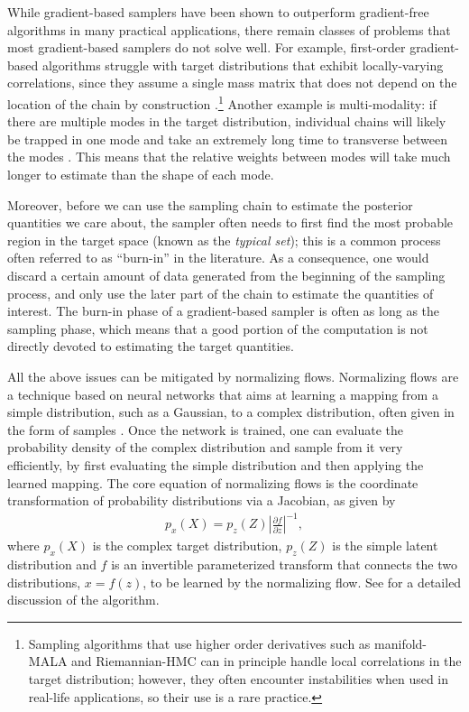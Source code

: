 \documentclass[twocolumn]{aastex631}
\begin{document}
While gradient-based samplers have been shown to outperform gradient-free
algorithms in many practical applications, there remain classes of problems
that most gradient-based samplers do not solve well. For example, first-order
gradient-based algorithms struggle with target distributions that exhibit
locally-varying correlations, since they assume a single mass matrix that does
not depend on the location of the chain by construction
\cite{2017arXiv170102434B}.\footnote{Sampling algorithms that use higher order
derivatives such as manifold-MALA and Riemannian-HMC \cite{RMHMC} can in
principle handle local correlations in the target distribution; however, they
often encounter instabilities when used in real-life applications, so their use
is a rare practice.} Another example is multi-modality: if there are multiple
modes in the target distribution, individual chains will likely be trapped in
one mode and take an extremely long time to transverse between the modes
\cite{2018arXiv180803230M}.  This means that the relative weights between modes
will take much longer to estimate than the shape of each mode.

Moreover, before we can use the sampling chain to estimate the posterior
quantities we care about, the sampler often needs to first find the most
probable region in the target space (known as the \emph{typical set}); this is
a common process often referred to as ``burn-in'' in the literature. As a
consequence, one would discard a certain amount of data generated from the
beginning of the sampling process, and only use the later part of the chain to
estimate the quantities of interest. The burn-in phase of a gradient-based
sampler is often as long as the sampling phase, which means that a good portion
of the computation is not directly devoted to estimating the target quantities.

All the above issues can be mitigated by normalizing flows.  Normalizing flows
are a technique based on neural networks that aims at learning a mapping from a
simple distribution, such as a Gaussian, to a complex distribution, often given
in the form of samples \cite{2019arXiv190809257K, 2019arXiv191202762P}. Once
the network is trained, one can evaluate the probability density of the complex
distribution and sample from it very efficiently, by first evaluating the
simple distribution and then applying the learned mapping. The core equation
of normalizing flows is the coordinate transformation of probability
distributions via a Jacobian, as given by
\begin{align}
    p_x(X) = p_z(Z) \left| \frac{\partial f}{\partial z}\right|^{-1},
\end{align}
where $p_x(X)$ is the complex target distribution, $p_z(Z)$ is the simple
latent distribution and $f$ is an invertible parameterized transform that
connects the two distributions, $x = f(z)$, to be learned by the normalizing
flow. See \cite{2019arXiv190809257K, 2019arXiv191202762P} for a detailed
discussion of the algorithm.
\end{document}
